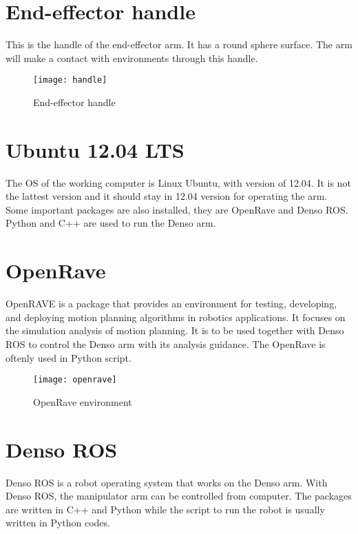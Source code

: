 \section{End-effector handle}
This is the handle of the end-effector arm. It has a round sphere surface. The arm will make a contact with environments through this handle.
\begin{figure}[H]
    \centering
    \texttt{[image: handle]}
    \caption{End-effector handle}
    \label{fig:end-effector}
\end{figure}

\section{Ubuntu 12.04 LTS}
The OS of the working computer is Linux Ubuntu, with version of 12.04. It is not the lattest version and it should stay in 12.04 version for operating the arm. Some important packages are also installed, they are OpenRave and Denso ROS. Python and C++ are used to run the Denso arm.

\section{OpenRave}
OpenRAVE is a package that provides an environment for testing, developing, and deploying motion planning algorithms in robotics applications. It focuses on the simulation analysis of motion planning. It is to be used together with Denso ROS to control the Denso arm with its analysis guidance. The OpenRave is oftenly used in Python script.
\begin{figure}[H]
    \centering
    \texttt{[image: openrave]}
    \caption{OpenRave environment}
    \label{fig:OpenRave}
\end{figure}
  
\section{Denso ROS}
Denso ROS is a robot operating system that works on the Denso arm. With Denso ROS, the manipulator arm can be controlled from computer. The packages are written in C++ and Python while the script to run the robot is usually written in Python codes.
